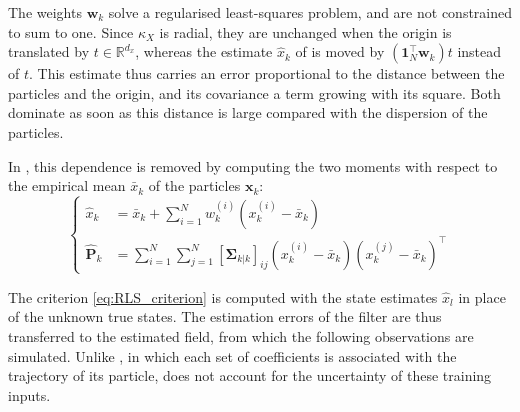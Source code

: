 \begin{algorithm}[!htb]
\begin{algorithmic}
	\end{algorithmic}\caption{AKKF-SLAM}\label{alg:AKKF_SLAM}
\end{algorithm}

\begin{remark}
	The weights $\mathbf{w}_k$ solve a regularised least-squares problem, and are not constrained to sum to one. Since $\kappa_X$ is radial, they are unchanged when the origin is translated by $t\in\mathbb{R}^{d_x}$, whereas the estimate $\hat{x}_k$ of  is moved by $\left(\mathbf{1}_N^\top\mathbf{w}_k\right)t$ instead of $t$. This estimate thus carries an error proportional to the distance between the particles and the origin, and its covariance a term growing with its square. Both dominate as soon as this distance is large compared with the dispersion of the particles.

	In , this dependence is removed by computing the two moments with respect to the empirical mean $\bar{x}_k$ of the particles $\mathbf{x}_k$:
	\begin{equation}
		\left\{\begin{aligned}
		\hat{x}_k&=\bar{x}_k+\sum_{i=1}^Nw_k^{(i)}\left(x_k^{(i)}-\bar{x}_k\right)\\
		\hat{\mathbf{P}}_k&=\sum_{i=1}^N\sum_{j=1}^N\left[\boldsymbol{\Sigma}_{k|k}\right]_{ij}\left(x_k^{(i)}-\bar{x}_k\right)\left(x_k^{(j)}-\bar{x}_k\right)^\top
		\end{aligned}\right.
	\end{equation}
\end{remark}

\begin{remark}
	The criterion \eqref{eq:RLS_criterion} is computed with the state estimates $\hat{x}_l$ in place of the unknown true states. The estimation errors of the filter are thus transferred to the estimated field, from which the following observations are simulated. Unlike , in which each set of coefficients is associated with the trajectory of its particle,  does not account for the uncertainty of these training inputs.
\end{remark}

